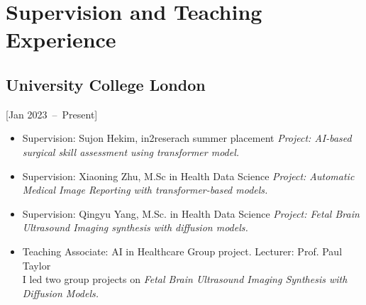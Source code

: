 \documentclass{mycv}
\begin{document}
\section{Supervision and Teaching Experience}

\subsection{University College London}[Jan 2023~--~Present]
\begin{itemize}
	\item Supervision: Sujon Hekim, in2reserach summer placement
			\textit{Project: AI-based surgical skill assessment using transformer model.}

	\item Supervision: Xiaoning Zhu, M.Sc in Health Data Science
		\textit{Project: Automatic Medical Image Reporting with transformer-based models.}
	\item Supervision: Qingyu Yang, M.Sc. in Health Data Science
		\textit{Project: Fetal Brain Ultrasound Imaging synthesis with diffusion models.}

	\item Teaching Associate: AI in Healthcare Group project. Lecturer: Prof. Paul Taylor 
	\\ I led two group projects on \textit{Fetal Brain Ultrasound Imaging Synthesis with Diffusion Models.}

\end{itemize}
\end{document}

